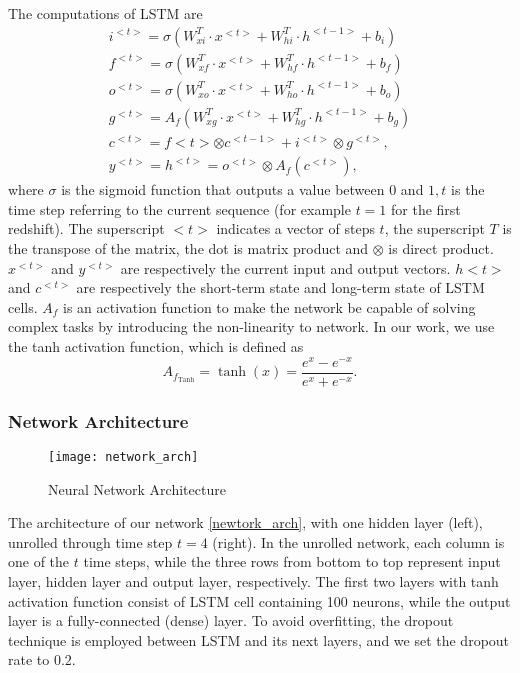 The computations of LSTM are
\begin{align}
i^{<t>}=\sigma\left(W_{x i}^{T} \cdot x^{<t>}+W_{h i}^{T} \cdot h^{<t-1>}+b_{i}\right) \\
f^{<t>}=\sigma\left(W_{x f}^{T} \cdot x^{<t>}+W_{h f}^{T} \cdot h^{<t-1>}+b_{f}\right) \\
o^{<t>}=\sigma\left(W_{x o}^{T} \cdot x^{<t>}+W_{h o}^{T} \cdot h^{<t-1>}+b_{o}\right) \\
g^{<t>}=A_{f}\left(W_{x g}^{T} \cdot x^{<t>}+W_{h g}^{T} \cdot h^{<t-1>}+b_{g}\right) \\
c^{<t>}=f<t>\otimes c^{<t-1>}+i^{<t>} \otimes g^{<t>}, \\
y^{<t>}=h^{<t>}=o^{<t>} \otimes A_{f}\left(c^{<t>}\right),
\end{align}
where $\sigma$ is the sigmoid function that outputs a value between 0 and $1, t$ is the time step referring to the current sequence (for example $t=1$ for the first redshift). The superscript $<t>$ indicates a vector of steps $t$, the superscript $T$ is the transpose of the matrix, the dot is matrix product and $\otimes$ is direct product. $x^{<t>}$ and $y^{<t>}$ are respectively the current input and output vectors. $h<t>$ and $c^{<t>}$ are respectively the short-term state and long-term state of LSTM cells. $A_{f}$ is an activation function to make the network be capable of solving complex tasks by introducing the non-linearity to network. In our work, we use the tanh activation function, which is defined as
$$
A_{f_{\operatorname{Tanh}}}=\tanh (x)=\frac{e^{x}-e^{-x}}{e^{x}+e^{-x}} .
$$

\subsubsection{Network Architecture}
\begin{figure} [H]
	\centering
	\texttt{[image: network\_arch]}
	\caption{Neural Network Architecture}
	\label{newtork_arch}
\end{figure}

The architecture of our network \eqref{newtork_arch}, with one hidden layer (left), unrolled through time step $t=4$ (right). In the unrolled network, each column is one of the $t$ time steps, while the three rows from bottom to top represent input layer, hidden layer and output layer, respectively. The first two layers with tanh activation function consist of LSTM cell containing 100 neurons, while the output layer is a fully-connected (dense) layer. To avoid overfitting, the dropout technique is employed between LSTM and its next layers, and we set the dropout rate to $0.2$.


